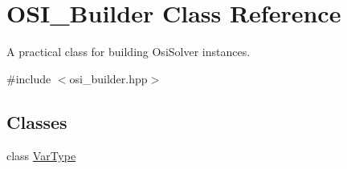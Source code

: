 \hypertarget{class_o_s_i___builder}{}\section{O\+S\+I\+\_\+\+Builder Class Reference}
\label{class_o_s_i___builder}


A practical class for building Osi\+Solver instances.  




{\ttfamily \#include $<$osi\+\_\+builder.\+hpp$>$}

\subsection*{Classes}
\begin{DoxyCompactItemize}
\item 
class \hyperlink{class_o_s_i___builder_1_1_var_type}{Var\+Type}
\end{DoxyCompactItemize}
